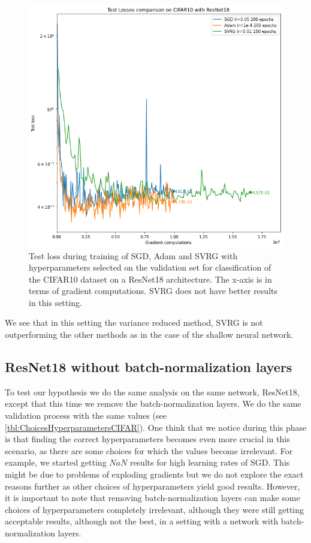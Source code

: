 \documentclass[a4paper,11pt,oneside]{report}
\begin{document}
\begin{figure}
    \centering
    \includegraphics[width=\columnwidth]{figures/ResNet18Results.png}
    \caption{Test loss during training of SGD, Adam and SVRG with hyperparameters selected on the validation set for classification of the CIFAR10 dataset on a ResNet18 architecture. The x-axis is in terms of gradient computations. SVRG does not have better results in this setting.}
    \label{fig:ResNet18results}
\end{figure}

We see that in this setting the variance reduced method, SVRG is not outperforming the other methods as in the case of the shallow neural network. 

\subsection{ResNet18 without batch-normalization layers}

To test our hypothesis we do the same analysis on the same network, ResNet18, except that this time we remove the batch-normalization layers. We do the same validation process with the same values (see \autoref{tbl:ChoicesHyperparametersCIFAR}). One think that we notice during this phase is that finding the correct hyperparameters becomes even more crucial in this scenario, as there are some choices for which the values become irrelevant. For example, we started getting $NaN$ results for high learning rates of SGD. This might be due to problems of exploding gradients but we do not explore the exact reasons further as other choices of hyperparameters yield good results. However, it is important to note that removing batch-normalization layers can make some choices of hyperparameters completely irrelevant, although they were still getting acceptable results, although not the best, in a setting with a network with batch-normalization layers.
\end{document}
